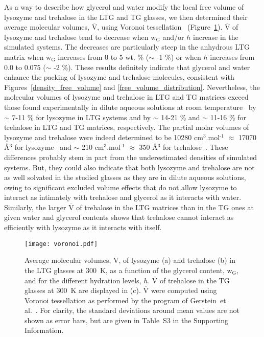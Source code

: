 \documentclass[journal=jpcbfk,manuscript=article]{achemso}
\begin{document}
\begin{singlespacing}
As a way to describe how glycerol and water modify the local free volume of lysozyme and trehalose in the LTG and TG glasses,
we then determined their average molecular volumes, $\overline{\textrm{V}}$, using Voronoi tessellation~\cite{Gerstein1995} 
(Figure~\ref{molecular_volume}).
$\overline{\textrm{V}}$ of lysozyme and trehalose tend to decrease when w$_{\textrm{G}}$ and/or $h$ increase in the simulated
systems. The decreases are particularly steep in the anhydrous LTG matrix when w$_{\textrm{G}}$ increases from 0 to 5 wt. \% 
($\sim$ -1 \%) or when $h$ increases from 0.0 to 0.075 ($\sim$ -2 \%). These results definitely indicate that glycerol and water
enhance the packing of lysozyme and trehalose molecules, consistent with Figures~\ref{density_free_volume} and \ref{free_volume_distribution}.
Nevertheless, the molecular volumes of lysozyme and trehalose in LTG and TG matrices exceed those found experimentally 
in dilute aqueous solutions at room temperature~\cite{Makhatadze1990,Miller1997} by $\sim$ 7-11 \% for lysozyme 
in LTG systems and by $\sim$ 14-21 \% and $\sim$ 11-16 \% for trehalose in LTG and TG matrices, respectively. 
The partial molar volumes of lysozyme and trehalose were indeed determined to be 
10280 cm$^{\textrm{3}}$.mol$^{\textrm{-1}}$ $\approx$ 17070 \AA \/$^{\textrm{3}}$ for lysozyme~\cite{Makhatadze1990} and 
$\sim$ 210 cm$^{\textrm{3}}$.mol$^{\textrm{-1}}$ $\approx$ 350 \AA \/$^{\textrm{3}}$ for trehalose~\cite{Miller1997}.
These differences probably stem in part from the underestimated densities of simulated systems. But, they could also indicate that both 
lysozyme and trehalose are not as well solvated in the studied glasses as they are in dilute aqueous solutions,
owing to significant excluded volume effects that do not allow lysozyme to interact as intimately with trehalose and glycerol 
as it interacts with water. Similarly, the larger $\overline{\textrm{V}}$ of trehalose in the LTG matrices than in the TG ones 
at given water and glycerol contents shows that trehalose cannot interact as efficiently with lysozyme as it interacts with itself.

\begin{figure}[htbp]
\texttt{[image: voronoi.pdf]}
\caption{\label{molecular_volume}
Average molecular volumes, $\overline{\textrm{V}}$, of lysozyme (a) and trehalose (b) in the LTG glasses at 300~K, as a function of the glycerol 
content, w$_{\textrm{G}}$, and for the different hydration levels, $h$. $\overline{\textrm{V}}$ of trehalose in the TG glasses at 300~K are 
displayed in (c). $\overline{\textrm{V}}$ were computed
using Voronoi tessellation as performed by the program of Gerstein~{et al.}~\cite{Gerstein1995}. For clarity,
the standard deviations around mean values are not shown as error bars, but are given in Table~S3 in the Supporting Information.
}
\end{figure}



\end{singlespacing}
\end{document}
